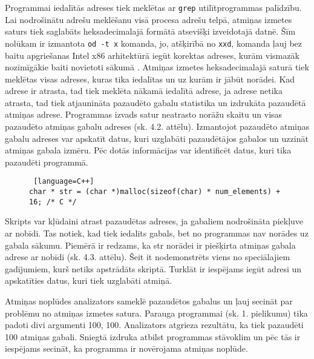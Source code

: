 Programmai iedalītās adreses tiek meklētas ar \texttt{grep} utilītprogrammas palīdzību.
Lai nodrošinātu adrešu meklēšanu visā procesa adrešu telpā, atmiņas izmetes saturs tiek saglabāts heksadecimalajā formātā atsevišķi izveidotajā datnē.
Šīm nolūkam ir izmantota \texttt{od -t x} komanda, jo, atšķirībā no \texttt{xxd}, komanda ļauj bez baitu apgriešanas Intel x86 arhitektūrā iegūt korektas adreses, kurām  vismazāk nozīmīgākie baiti novietoti sākumā \cite{DPT}.
Atmiņas izmetes heksadecimalajā saturā tiek meklētas visas adreses, kuras tika iedalītas un uz kurām ir jābūt norādei.
Kad adrese ir atrasta, tad tiek meklēta nākamā iedalītā adrese, ja adrese netika atrasta, tad tiek atjaunināta pazaudēto gabalu statistika un izdrukāta pazaudētā atmiņas adrese.
Programmas izvads satur neatrasto norāžu skaitu un visas pazaudēto atmiņas gabalu adreses (sk. 4.2. attēlu).
Izmantojot pazaudēto atmiņas gabalu adreses var apskatīt datus, kuri uzglabāti pazaudētājos gabalos un uzzināt atmiņas gabala izmēru.
Pēc dotās informācijas var identificēt datus, kuri tika pazaudēti programmā.


\begin{figure}[h]
\begin{lstlisting} [language=C++]
char * str = (char *)malloc(sizeof(char) * num_elements) + 16; /* C */
\end{lstlisting}
\caption{\textbf{\fontsize{11}{12}\selectfont {Speciālgadījums - procesa adrešu telpā nav norādes uz gabala sākumu}}}
\end{figure}


Skripts var kļūdaini atrast pazaudētas adreses, ja gabaliem nodrošināta piekļuve ar nobīdi.
Tas notiek, kad tiek iedalīts gabals, bet no programmas nav norādes uz gabala sākumu.
Piemērā ir redzams, ka str norādei ir piešķirta atmiņas gabala adrese ar nobīdi (sk. 4.3. attēlu).
Šeit it nodemonstrēts viens no speciālajiem gadījumiem, kurš netiks apstrādāts skriptā. 
Turklāt ir iespējams iegūt adresi un apskatīties datus, kuri tiek uzglabāti atmiņā.



Atmiņas noplūdes analizators sameklē pazaudētos gabalus un ļauj secināt par problēmu no atmiņas izmetes satura.
Parauga programmai (sk. 1. pielikumu) tika padoti divi argumenti 100, 100. 
Analizators atgrieza rezultātu, ka tiek pazaudēti 100 atmiņas gabali.
Sniegtā izdruka atbilst programmas stāvoklim un pēc tās ir iespējams secināt, ka programma ir novērojama atmiņas noplūde.


